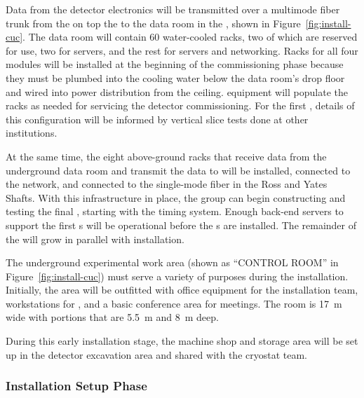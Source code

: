 Data from the detector electronics will be transmitted over a multimode fiber trunk from the  on top the  to the  data room in the , shown in Figure~\ref{fig:install-cuc}.  The data room will contain 60 water-cooled racks, two of which are reserved for  use, two for  servers, and the rest for  servers and networking. Racks for all four modules will be installed at the beginning of the  commissioning phase because they must be plumbed into the cooling water below the data room's drop floor and wired into power distribution from the ceiling.   equipment will populate the racks as needed for servicing the detector commissioning.  For the first , details of this configuration will be informed by  vertical slice tests done at other institutions.  

At the same time, the eight above-ground  racks that receive data from the underground data room and  transmit the data to  will 
be installed, connected to the network, and connected to the single-mode fiber in the Ross and Yates Shafts.  With this infrastructure in place, the  group can begin constructing and testing the final  , starting with the timing system. 
Enough  back-end servers to support the first s will be operational before the s are installed.  The remainder of the  will grow in parallel with  installation.

The underground experimental work area (shown as ``CONTROL ROOM'' in Figure~\ref{fig:install-cuc}) must serve a variety of purposes during the  installation. Initially, the area will be outfitted with office equipment for the installation team, workstations for , and a basic conference area for meetings. The room is \SI{17}{m} wide with portions that are \SI{5.5}{m} and \SI{8}{m} deep.

During this early installation stage, the machine shop and  storage area will be set up in the detector excavation area and shared with the cryostat team. 

\subsubsection{Installation Setup Phase}
\label{sec:fdsp-tc-inst-setup}

